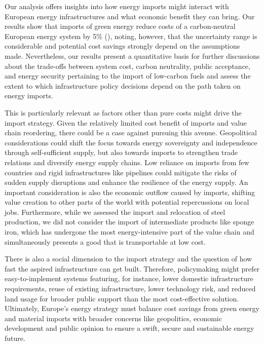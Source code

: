 
Our analysis offers insights into how energy imports might interact with
European energy infrastructures and what economic benefit they can bring. Our
results show that imports of green energy reduce costs of a carbon-neutral
European energy system by 5\% (), noting, however, that the
uncertainty range is considerable and potential cost savings strongly depend on
the assumptions made. Nevertheless, our results present a quantitative basis for
further discussions about the trade-offs between system cost, carbon neutrality,
public acceptance, and energy security pertaining to the import of low-carbon
fuels and assess the extent to which infrastructure policy decisions depend on
the path taken on energy imports.

This is particularly relevant as factors other than pure costs might drive the
import strategy. Given the relatively limited cost benefit of imports and value
chain reordering, there could be a case against pursuing this avenue.
Geopolitical considerations could shift the focus towards energy sovereignty and
independence through self-sufficient supply, but also towards imports to
strengthen trade relations and diversify energy supply chains. Low reliance on
imports from few countries and rigid infrastructures like pipelines could
mitigate the risks of sudden supply disruptions and enhance the resilience of
the energy supply. An important consideration is also the economic outflow
caused by imports, shifting value creation to other parts of the world with
potential repercussions on local jobs. Furthermore, while we assessed the import
and relocation of steel production, we did not consider the import of
intermediate products like sponge iron, which has undergone the most
energy-intensive part of the value chain and simultaneously presents a good that
is transportable at low cost.


There is also a social dimension to the import strategy and the question of how
fast the aspired infrastructure can get built. Therefore, policymaking might
prefer easy-to-implement systems featuring, for instance, lower domestic
infrastructure requirements, reuse of existing infrastructure, lower technology
risk, and reduced land usage for broader public support than the most
cost-effective solution. Ultimately, Europe's energy strategy must balance cost
savings from green energy and material imports with broader concerns like
geopolitics, economic development and public opinion to ensure a swift, secure
and sustainable energy future.
